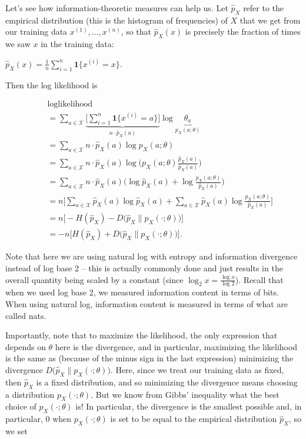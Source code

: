 Let's see how information-theoretic measures can help us. Let $\widehat{p}_{X}$ refer to the empirical distribution (this is the histogram of frequencies) of $X$ that we get from our training data $x^{(1)},\dots ,x^{(n)}$, so that $\widehat{p}_{X}(x)$ is precisely the fraction of times we saw $x$ in the training data:

{\centering$\widehat{p}_{X}(x)=\frac{1}{n}\sum _{i=1}^{n}\mathbf{1}\{ x^{(i)}=x\} .$ \par}
 
Then the log likelihood is

\begin{eqnarray*}
 &  & \log\text{likelihood}\\
 &  & =\sum_{a\in\mathcal{X}}\underbrace{\bigg[\sum_{i=1}^{n}\mathbf{1}\{x^{(i)}=a\}\bigg]}_{n\cdot\widehat{p}_{X}(a)}\log\underbrace{\theta_{a}}_{p_{X}(a;\theta)}\\
 &  & =\sum_{a\in\mathcal{X}}n\cdot\widehat{p}_{X}(a)\log p_{X}(a;\theta)\\
 &  & =\sum_{a\in\mathcal{X}}n\cdot\widehat{p}_{X}(a)\log\Big(p_{X}(a;\theta)\frac{\widehat{p}_{X}(a)}{\widehat{p}_{X}(a)}\Big)\\
 &  & =\sum_{a\in\mathcal{X}}n\cdot\widehat{p}_{X}(a)\Big(\log\widehat{p}_{X}(a)+\log\frac{p_{X}(a;\theta)}{\widehat{p}_{X}(a)}\Big)\\
 &  & =n\bigg[\sum_{a\in\mathcal{X}}\widehat{p}_{X}(a)\log\widehat{p}_{X}(a)+\sum_{a\in\mathcal{X}}\widehat{p}_{X}(a)\log\frac{p_{X}(a;\theta)}{\widehat{p}_{X}(a)}\bigg]\\
 &  & =n\big[-H(\widehat{p}_{X})-D\big(\widehat{p}_{X}\parallel p_{X}(\cdot;\theta)\big)\big]\\
 &  & =-n\big[H(\widehat{p}_{X})+D\big(\widehat{p}_{X}\parallel p_{X}(\cdot;\theta)\big)\big].
\end{eqnarray*}

Note that here we are using natural log with entropy and information divergence instead of log base 2 -- this is actually commonly done and just results in the overall quantity being scaled by a constant (since $\log _2 x = \frac{\log x}{\log 2}$). Recall that when we used log base 2, we measured information content in terms of bits. When using natural log, information content is measured in terms of what are called nats.

Importantly, note that to maximize the likelihood, the only expression that depends on $\theta$ here is the divergence, and in particular, maximizing the likelihood is the same as (because of the minus sign in the last expression) minimizing the divergence $D\big (\widehat{p}_{X}\parallel p_{X}(\cdot ;\theta )\big )$. Here, since we treat our training data as fixed, then $\widehat{p}_{X}$ is a fixed distribution, and so minimizing the divergence means choosing a distribution $p_{X}(\cdot ;\theta )$. But we know from Gibbs' inequality what the best choice of $p_{X}(\cdot ;\theta )$ is! In particular, the divergence is the smallest possible and, in particular, 0 when $p_{X}(\cdot ;\theta )$ is set to be equal to the empirical distribution $\widehat{p}_{X}$, so we set

